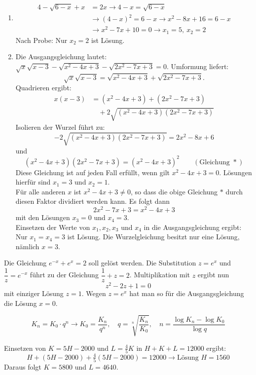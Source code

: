 \begin{enumerate}[label=\alph*)]
  \item \begin{align*}
      4 - \sqrt{6-x} + x &= 2x \rightarrow 4 - x = \sqrt{6-x}\\
      &\rightarrow (4-x)^2 = 6 - x \rightarrow x^2 - 8x + 16 = 6 - x\\
      &\rightarrow x^2 - 7x + 10 = 0 \rightarrow x_1 = 5,\ x_2 = 2
    \end{align*}
    Nach Probe: Nur $x_2 = 2$ ist Lösung.
  \item Die Ausgangsgleichung lautet: $\sqrt{x}\sqrt{x-3} - \sqrt{x^2 - 4x + 3} - \sqrt{2x^2 - 7x + 3} = 0$. Umformung liefert:
    \[ \sqrt{x}\sqrt{x-3} = \sqrt{x^2 - 4x + 3} + \sqrt{2x^2 - 7x + 3} . \]
    Quadrieren ergibt:
    \begin{align*}
      x(x-3) &= (x^2 - 4x + 3) + (2x^2 - 7x + 3)\\
      &\quad + 2\sqrt{(x^2 - 4x + 3)(2x^2 - 7x + 3)}
    \end{align*}
    Isolieren der Wurzel führt zu:
    \[ -2\sqrt{(x^2 - 4x + 3)(2x^2 - 7x + 3)} = 2x^2 - 8x + 6 \]
    und
    \[ (x^2 - 4x + 3)(2x^2 - 7x + 3) = (x^2 - 4x + 3)^2 \qquad (\text{Gleichung } *) \]
    Diese Gleichung ist auf jeden Fall erfüllt, wenn gilt $x^2 - 4x + 3 = 0$. Lösungen hierfür sind $x_1 = 3$ und $x_2 = 1$.\\
    Für alle anderen $x$ ist $x^2 - 4x + 3 \neq 0$, so dass die obige Gleichung $*$ durch diesen Faktor dividiert werden kann. Es folgt dann
    \[ 2x^2 - 7x + 3 = x^2 - 4x + 3 \]
    mit den Lösungen $x_3 = 0$ und $x_4 = 3$.\\
    Einsetzen der Werte von $x_1, x_2, x_3$ und $x_4$ in die Ausgangsgleichung ergibt: Nur $x_1 = x_4 = 3$ ist Lösung. Die Wurzelgleichung besitzt nur eine Lösung, nämlich $x = 3$.
\end{enumerate}

Die Gleichung $e^{-x} + e^x = 2$ soll gelöst werden. Die Substitution $z = e^x$ und $\dfrac{1}{z} = e^{-x}$ führt zu der Gleichung $\dfrac{1}{z} + z = 2$. Multiplikation mit $z$ ergibt nun
\[ z^2 - 2z + 1 = 0 \]
mit einziger Lösung $z = 1$. Wegen $z = e^x$ hat man so für die Ausgangsgleichung die Lösung $x = 0$.

\[ K_n = K_0 \cdot q^n \rightarrow K_0 = \frac{K_n}{q^n} , \quad q = \sqrt[n]{\frac{K_n}{K_0}} , \quad n = \frac{\log K_n - \log K_0}{\log q} \]

Einsetzen von $K = 5H - 2000$ und $L = \tfrac{4}{5}K$ in $H + K + L = 12000$ ergibt:
\[ H + (5H - 2000) + \tfrac{4}{5}(5H - 2000) = 12000 \rightarrow \text{Lösung } H = 1560 \]
Daraus folgt $K = 5800$ und $L = 4640$.
